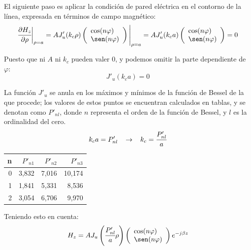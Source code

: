 \documentclass[12pt]{article}
\begin{document}
El siguiente paso es aplicar la condici\'on de pared el\'ectrica en el contorno de la l\'inea, expresada en t\'erminos de campo magn\'etico:
$$\cfrac{\partial H_z}{\partial\rho}\bigg|_{\rho = a} = A J'_u(k_c\rho)\left( \begin{array}{l}
        \cos(n\varphi) \\
        \sen(n\varphi)\end{array} \right)\Bigg|_{\rho = a} = A J'_u(k_c a)\left( \begin{array}{l}
        \cos(n\varphi) \\
        \sen(n\varphi)\end{array} \right)=0$$

Puesto que ni $A$ ni $k_c$ pueden valer 0, y podemos omitir la parte dependiente de $\varphi$:
$$J'_u(k_c a) = 0$$
	
	La funci\'on $J'_u$ se anula en los m\'aximos y m\'inimos de la funci\'on de Bessel de la que procede; los valores de estos puntos se encuentran calculados en tablas, y se denotan como $P'_{nl}$, donde $n$ representa el orden de la funci\'on de Bessel, y $l$ es la ordinalidad del cero.
$$k_c a = P'_{nl} \hspace{0.3cm}\rightarrow \hspace{0.3cm} k_c = \cfrac{P'_{nl}}{a}$$

\begin{center}
  \begin{tabular}{ r | r | r | r }
    n & $P'_{n1}$ & $P'_{n2}$ & $P'_{n3}$\\ \hline
    0 & 3,832 & 7,016 & 10,174\\ \hline
    1 & 1,841 & 5,331 & 8,536\\ \hline
    2 & 3,054 & 6,706 & 9,970\\
  \end{tabular}
\end{center}

Teniendo esto en cuenta: 
$$H_z = A J_u\left(\cfrac{P'_{nl}}{a}\rho\right)\left( \begin{array}{l}
        \cos(n\varphi) \\
        \sen(n\varphi)\end{array} \right) e^{-j\beta z}$$
        
\end{document}
